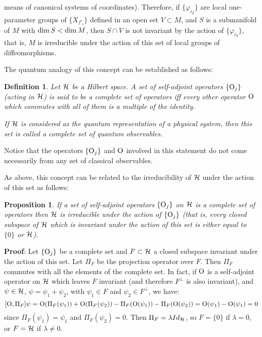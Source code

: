 \documentclass[12pt]{article}
\theoremstyle{plain}
\newtheorem{prop}{Proposition}
\newtheorem{definition}{Definition}
\def\qed{\ifvmode\removelastskip\fi
{\unskip\nobreak\hfil\penalty50\hbox{}\nobreak\hfil
\hbox{\vrule height1.2ex width1.2ex}\parfillskip=0pt
\finalhyphendemerits=0 \par\smallskip}}
\def\H{{\cal H}}
\def\Op{{\rm O}}
\begin{document}
means
of canonical systems of coordinates).
Therefore, if $\{ {\varphi_i}_t \}$ are local one-parameter
groups of $\{ X_{f'_i} \}$ defined in an open set $V \subset M$,
and $S$ is a submanifold of $M$ with ${\rm dim}\, S<{\rm dim}\, M$,
then $S \cap V$ is not invariant by the action of
$\{ {\varphi_i}_t \}$, that is, $M$ is irreducible under the action of
this
set of local groups of diffeomorphisms.

The quantum analogy of this concept can be established as follows:

\begin{definition}
Let $\H$ be a Hilbert space.
A set of self-adjoint operators $\{ \Op_j \}$ (acting in $\H$)
is said to be a {\rm complete set of operators}
iff every other operator $\Op$ which commutes with
all of them is a multiple of the identity.

If $\H$ is considered as the quantum representation of
a physical system, then this set is called a
{\rm complete set of quantum observables}.
\end{definition}

Notice that the operators $\{ \Op_j \}$ and $\Op$
involved in this statement do not come necessarily
 from any set of classical observables.

As above, this concept can be  related to the irreducibility of $\H$
under
the action of this set as follows:

\begin{prop}
If a set of self-adjoint operators
$\{ \Op_j \}$ on $\H$ is a complete set of operators
then $\H$ is irreducible under the action of $\{ \Op_j \}$
(that is, every closed subspace of $\H$ which is invariant
under the action of this set is either equal to $\{ 0 \}$ or $\H$).
\end{prop}
{\bf Proof}: 
Let $\{ \Op_j \}$ be a complete set and $F \subset \H$
a closed subspace invariant under the action
of this set. Let $\Pi_F$ be the projection operator
over $F$. Then $\Pi_F$ commutes with all the elements of
the complete set. In fact, if $\Op$ is a self-adjoint operator on $\H$
which leaves $F$ invariant (and therefore $F^\perp$ is also invariant),
and $\psi \in \H$, $\psi = \psi_1+\psi_2$,
with $\psi_1 \in F$ and $\psi_2 \in F^\perp$, we have:
$$
[\Op ,\Pi_F]\psi =
\Op (\Pi_F (\psi_1))+\Op (\Pi_F (\psi_2))-
\Pi_F(\Op (\psi_1))-\Pi_F(\Op (\psi_2)) =
\Op (\psi_1) -\Op (\psi_1) = 0
$$
since $\Pi_F (\psi_1) = \psi_1$ and $\Pi_F (\psi_2) = 0$.
Then $\Pi_F=\lambda Id_{\H}$, so $F=\{ 0\}$ if $\lambda =0$,
or $F=\H$ if $\lambda\not= 0$.
\qed
\end{document}
